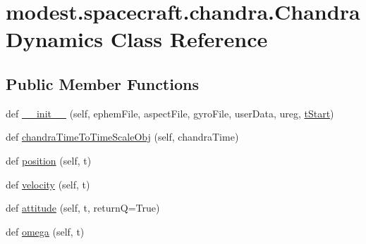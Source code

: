 \hypertarget{classmodest_1_1spacecraft_1_1chandra_1_1ChandraDynamics}{}\section{modest.\+spacecraft.\+chandra.\+Chandra\+Dynamics Class Reference}
\label{classmodest_1_1spacecraft_1_1chandra_1_1ChandraDynamics}
\subsection*{Public Member Functions}
\begin{DoxyCompactItemize}
\item 
def \hyperlink{classmodest_1_1spacecraft_1_1chandra_1_1ChandraDynamics_abb3690d722013b2d58b9581367509b62}{\+\_\+\+\_\+init\+\_\+\+\_\+} (self, ephem\+File, aspect\+File, gyro\+File, user\+Data, ureg, \hyperlink{classmodest_1_1spacecraft_1_1chandra_1_1ChandraDynamics_a9452eb26e394075494e1f5c3a621c87c}{t\+Start})
\item 
def \hyperlink{classmodest_1_1spacecraft_1_1chandra_1_1ChandraDynamics_aaeabce36a85e8afb6b661766baf44bb3}{chandra\+Time\+To\+Time\+Scale\+Obj} (self, chandra\+Time)
\item 
def \hyperlink{classmodest_1_1spacecraft_1_1chandra_1_1ChandraDynamics_ab29c36b3952f493f4a18c43cd0b28ce7}{position} (self, t)
\item 
def \hyperlink{classmodest_1_1spacecraft_1_1chandra_1_1ChandraDynamics_a583da7bd7466cb54f6c82973aae80903}{velocity} (self, t)
\item 
def \hyperlink{classmodest_1_1spacecraft_1_1chandra_1_1ChandraDynamics_a252a35c8cbeea66f100749e617f7d221}{attitude} (self, t, returnQ=True)
\item 
def \hyperlink{classmodest_1_1spacecraft_1_1chandra_1_1ChandraDynamics_aa24d12e3250a4d3ac3b6d986eba5e471}{omega} (self, t)
\end{DoxyCompactItemize}
